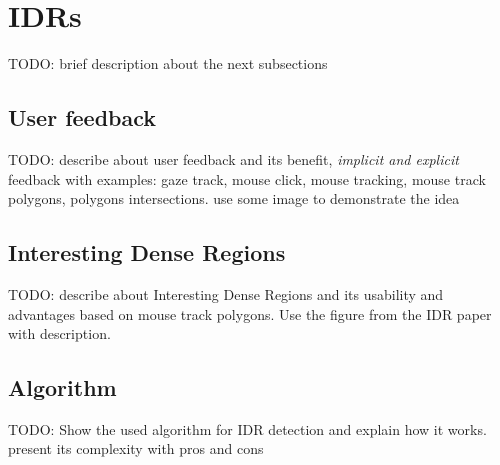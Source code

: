 \section{IDRs}

TODO: brief description about the next subsections

\subsection{User feedback}

TODO: describe about user feedback and its benefit, \textit{implicit and explicit} feedback with examples: gaze track, mouse click, mouse tracking, mouse track polygons, polygons intersections. use some image to demonstrate the idea

\subsection{Interesting Dense Regions}

TODO: describe about Interesting Dense Regions and its usability and advantages based on mouse track polygons. Use the figure from the IDR paper with description.

\subsection{Algorithm}

TODO: Show the used algorithm for IDR detection and explain how it works. present its complexity with pros and cons

